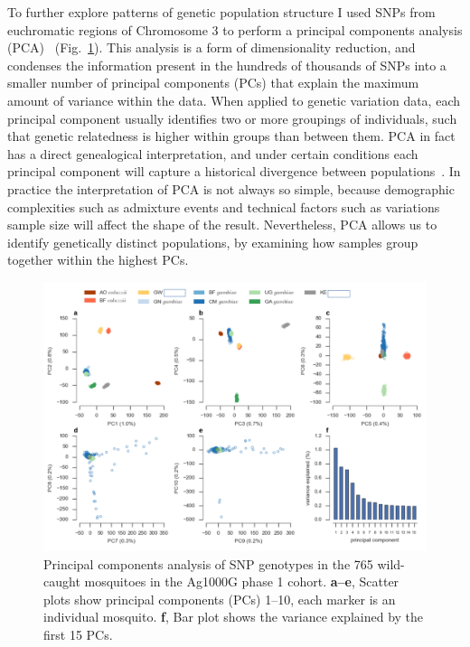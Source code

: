 \begin{refsection}
To further explore patterns of genetic population structure I used SNPs from euchromatic regions of Chromosome 3 to perform a principal components analysis (PCA)~\parencite{Patterson2006} (Fig.~\ref{fig:pca}).
%
This analysis is a form of dimensionality reduction, and condenses the information present in the hundreds of thousands of SNPs into a smaller number of principal components (PCs) that explain the maximum amount of variance within the data.
%
When applied to genetic variation data, each principal component usually identifies two or more groupings of individuals, such that genetic relatedness is higher within groups than between them.
%
PCA in fact has a direct genealogical interpretation, and under certain conditions each principal component will capture a historical divergence between populations~\parencite{McVean2009}.
%
In practice the interpretation of PCA is not always so simple, because demographic complexities such as admixture events and technical factors such as variations sample size will affect the shape of the result.
%
Nevertheless, PCA allows us to identify genetically distinct populations, by examining how samples group together within the highest PCs.


\begin{figure}[t!]
\centering
\includegraphics[width=1.1\textwidth,center]{artwork/chapter4/pca.pdf}
\caption{Principal components analysis of SNP genotypes in the 765 wild-caught mosquitoes in the Ag1000G phase 1 cohort.
%
\textbf{a--e}, Scatter plots show principal components (PCs) 1--10, each marker is an individual mosquito.
%
\textbf{f}, Bar plot shows the variance explained by the first 15 PCs.
%
}
\label{fig:pca}
\end{figure}



\end{refsection}
